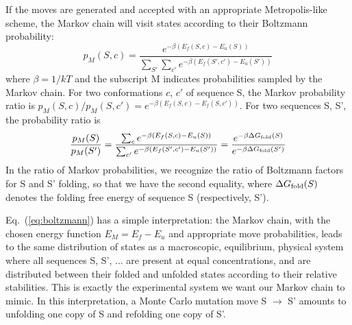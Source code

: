 If the moves are generated and accepted with an appropriate Metropolis-like scheme, the Markov chain will
visit states according to their Boltzmann probability: 
\begin{equation}  \label{eq:proba}
p_M(S,c) = \frac{ e^{-\beta(E_f(S,c)-E_u(S))} }{ \sum_{S'} \sum_{c'} e^{-\beta(E_f(S',c')-E_u(S'))} }
\end{equation}
where $\beta =1/kT$ and the subscript M indicates probabilities sampled by the Markov chain. For two conformations
$c$, $c'$ of sequence S, the Markov probability ratio is $p_M(S,c)/p_M(S,c') = e^{-\beta (E_f(S,c)-E_f(S,c'))}$. For two
sequences S, S', the probability ratio is
\begin{equation}  \label{eq:boltzmann}
\frac{p_M(S)}{p_M(S')} = \frac{ \sum_c e^{-\beta (E_f(S,c)-E_u(S))} }
                             { \sum_{c'} e^{-\beta(E_f(S',c')-E_u(S'))} }
                      = \frac{ e^{-\beta \Delta G_{\rm fold}(S)}}{e^{-\beta \Delta G_{\rm fold}(S')}}
\end{equation}
In the ratio of Markov probabilities, we recognize the ratio of Boltzmann factors for S and S' folding, so that we
have the second equality, where $\Delta G_{\rm fold}(S)$ denotes the folding free energy of sequence S (respectively, S').

Eq.\ (\ref{eq:boltzmann}) has a simple interpretation: the Markov chain, with the chosen energy function $E_M =
E_f - E_u$ and appropriate move probabilities, leads to the same distribution of states as a macroscopic, equilibrium,
physical system where all sequences S, S', ... are present at equal concentrations, and are distributed between their
folded and unfolded states according to their relative stabilities. This is exactly the experimental system we want
our Markov chain to mimic. In this interpretation, a Monte Carlo mutation move S $\rightarrow$ S' amounts to unfolding
one copy of S and refolding one copy of S'.

